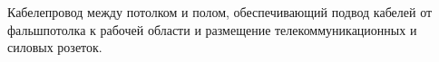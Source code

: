 Кабелепровод между потолком и полом, обеспечивающий подвод
кабелей от фальшпотолка к рабочей области и размещение
телекоммуникационных и силовых розеток.